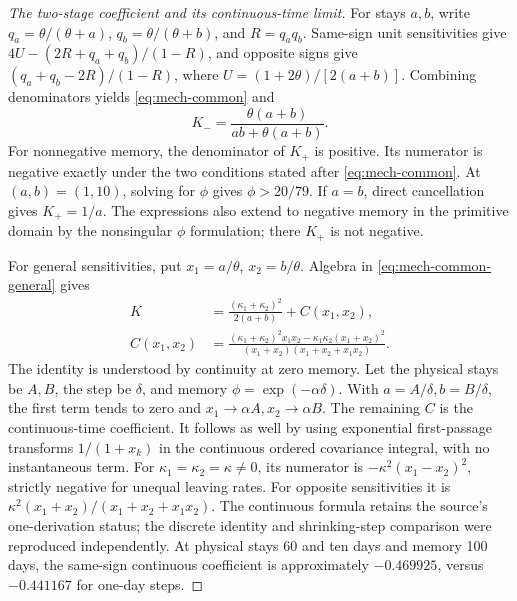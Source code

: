 \begin{proof}[The two-stage coefficient and its continuous-time limit]
For stays \(a,b\), write \(q_a=\theta/(\theta+a)\), \(q_b=\theta/(\theta+b)\), and \(R=q_aq_b\). Same-sign unit sensitivities give
\(4U-(2R+q_a+q_b)/(1-R)\), and opposite signs give \((q_a+q_b-2R)/(1-R)\), where \(U=(1+2\theta)/[2(a+b)]\). Combining denominators yields \eqref{eq:mech-common} and
\begin{equation}\label{eq:mech-opposite}
 K_- =\frac{\theta(a+b)}{ab+\theta(a+b)}.
\end{equation}
For nonnegative memory, the denominator of \(K_+\) is positive. Its numerator is negative exactly under the two conditions stated after \eqref{eq:mech-common}. At \((a,b)=(1,10)\), solving for \(\phi\) gives \(\phi>20/79\). If \(a=b\), direct cancellation gives \(K_+=1/a\). The expressions also extend to negative memory in the primitive domain by the nonsingular \(\phi\) formulation; there \(K_+\) is not negative.

For general sensitivities, put \(x_1=a/\theta\), \(x_2=b/\theta\). Algebra in \eqref{eq:mech-common-general} gives
\begin{align}
 K&=\frac{(\kappa_1+\kappa_2)^2}{2(a+b)}+C(x_1,x_2),\label{eq:mech-reconcile}\\
 C(x_1,x_2)&=\frac{(\kappa_1+\kappa_2)^2x_1x_2-\kappa_1\kappa_2(x_1+x_2)^2}
 {(x_1+x_2)(x_1+x_2+x_1x_2)}.\nonumber
\end{align}
The identity is understood by continuity at zero memory. Let the physical stays be \(A,B\), the step be \(\delta\), and memory \(\phi=\exp(-\alpha\delta)\). With \(a=A/\delta,b=B/\delta\), the first term tends to zero and \(x_1\to\alpha A,x_2\to\alpha B\). The remaining \(C\) is the continuous-time coefficient. It follows as well by using exponential first-passage transforms \(1/(1+x_k)\) in the continuous ordered covariance integral, with no instantaneous term. For \(\kappa_1=\kappa_2=\kappa\ne0\), its numerator is \(-\kappa^2(x_1-x_2)^2\), strictly negative for unequal leaving rates. For opposite sensitivities it is \(\kappa^2(x_1+x_2)/(x_1+x_2+x_1x_2)\). The continuous formula retains the source's one-derivation status; the discrete identity and shrinking-step comparison were reproduced independently. At physical stays 60 and ten days and memory 100 days, the same-sign continuous coefficient is approximately \(-0.469925\), versus \(-0.441167\) for one-day steps.
\end{proof}

